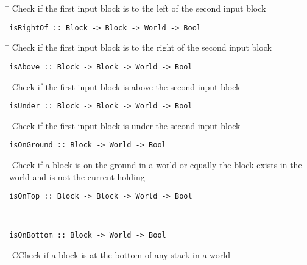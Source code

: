 \begin{tabbing}
\hspace*{1cm}\= \kill
\> Check if the first input block is to the left of the second input block
\end{tabbing}
\begin{verbatim}
isRightOf :: Block -> Block -> World -> Bool
\end{verbatim}
\begin{tabbing}
\hspace*{1cm}\= \kill
\> Check if the first input block is to the right of the second input block
\end{tabbing}
\begin{verbatim}
isAbove :: Block -> Block -> World -> Bool
\end{verbatim}
\begin{tabbing}
\hspace*{1cm}\= \kill
\> Check if the first input block is above the second input block
\end{tabbing}
\begin{verbatim}
isUnder :: Block -> Block -> World -> Bool
\end{verbatim}
\begin{tabbing}
\hspace*{1cm}\= \kill
\> Check if the first input block is under the second input block
\end{tabbing}
\begin{verbatim}
isOnGround :: Block -> World -> Bool
\end{verbatim}
\begin{tabbing}
\hspace*{1cm}\= \kill
\> Check if a block is on the ground in a world or equally the block exists in the \\
\> world and is not the current holding
\end{tabbing}
\begin{verbatim}
isOnTop :: Block -> Block -> World -> Bool
\end{verbatim}
\begin{tabbing}
\hspace*{1cm}\= \kill
\> 
\end{tabbing}
\begin{verbatim}
isOnBottom :: Block -> World -> Bool
\end{verbatim}
\begin{tabbing}
\hspace*{1cm}\= \kill
\> CCheck if a block is at the bottom of any stack in a world
\end{tabbing}
